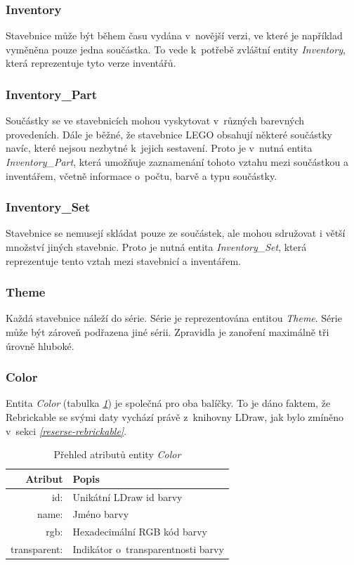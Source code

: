 \subsubsection*{Inventory}
Stavebnice může být během času vydána v~novější verzi, ve které je například vyměněna pouze jedna součástka. To vede k~potřebě zvláštní entity \textit{Inventory}, která reprezentuje tyto verze inventářů. 

\subsubsection*{Inventory\_Part} 
Součástky se ve stavebnicích mohou vyskytovat v~různých barevných provedeních. Dále je běžné, že stavebnice LEGO obsahují některé součástky navíc, které nejsou nezbytné k~jejich sestavení. Proto je v~nutná entita \textit{Inventory\_Part}, která umožňuje zaznamenání tohoto vztahu mezi součástkou a inventářem, včetně informace o~počtu, barvě a typu součástky.

\subsubsection*{Inventory\_Set}
Stavebnice se nemusejí skládat pouze ze součástek, ale mohou sdružovat i větší množství jiných stavebnic. Proto je nutná entita \textit{Inventory\_Set}, která reprezentuje tento vztah mezi stavebnicí a inventářem.

\subsubsection*{Theme}
Každá stavebnice náleží do série. Série je reprezentována entitou \textit{Theme}. Série může být zároveň podřazena jiné sérii. Zpravidla je zanoření maximálně tři úrovně hluboké.

\subsubsection*{Color} 
Entita \textit{Color} (tabulka \emph{\ref{table:entity:color}}) je společná pro oba balíčky. To je dáno faktem, že Rebrickable se svými daty vychází právě z~knihovny LDraw, jak bylo zmíněno v~sekci \emph{\ref{reserse-rebrickable}}.

\begin{table}[th!]
  \centering
  \caption{Přehled atributů entity \textit{Color}}
  \label{table:entity:color}
  \begin{tabularx}{\textwidth}{@{}rX@{}}
  \toprule
  Atribut & Popis
  \\ \midrule
  id: & Unikátní LDraw id barvy \autocite{ldraw:colors}
  \\
  name: & Jméno barvy
  \\
  rgb: & Hexadecimální \gls{RGB} kód barvy 
  \\
  transparent: & Indikátor o~transparentnosti barvy
  \\
  \bottomrule
  \end{tabularx}
\end{table}

